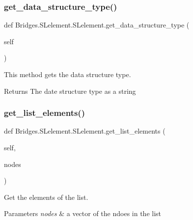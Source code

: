 \subsubsection{\texorpdfstring{get\+\_\+data\+\_\+structure\+\_\+type()}{get\_data\_structure\_type()}}
{\footnotesize\ttfamily def Bridges.\+S\+Lelement.\+S\+Lelement.\+get\+\_\+data\+\_\+structure\+\_\+type (\begin{DoxyParamCaption}\item[{}]{self }\end{DoxyParamCaption})}



This method gets the data structure type. 

\begin{DoxyReturn}{Returns}
The date structure type as a string 
\end{DoxyReturn}
\mbox{\label{class_bridges_1_1_s_lelement_1_1_s_lelement_a74cc9e951eb6a869534de13d46e46010}} 
\subsubsection{\texorpdfstring{get\+\_\+list\+\_\+elements()}{get\_list\_elements()}}
{\footnotesize\ttfamily def Bridges.\+S\+Lelement.\+S\+Lelement.\+get\+\_\+list\+\_\+elements (\begin{DoxyParamCaption}\item[{}]{self,  }\item[{}]{nodes }\end{DoxyParamCaption})}



Get the elements of the list. 


\begin{DoxyParams}{Parameters}
{\em nodes} & a vector of the ndoes in the list \\
\hline
\end{DoxyParams}
\mbox{\label{class_bridges_1_1_s_lelement_1_1_s_lelement_a754545c884b869be4b51e29d17d0797a}} 
